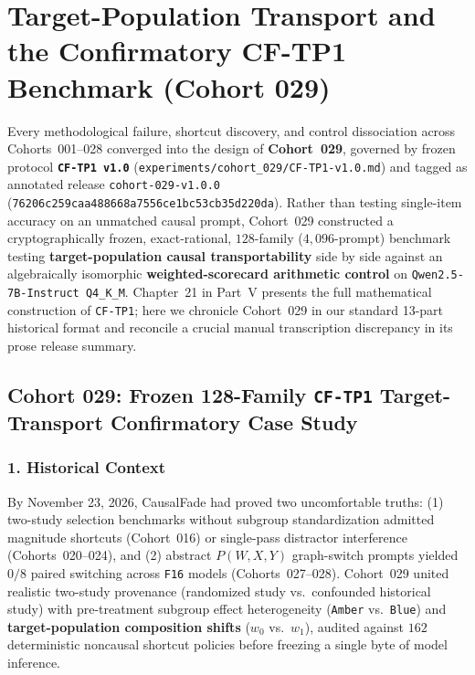 \chapter{Target-Population Transport and the Confirmatory CF-TP1 Benchmark (Cohort 029)}\label{ch:cohort_029}

Every methodological failure, shortcut discovery, and control dissociation across Cohorts~001--028 converged into the design of \textbf{Cohort~029}, governed by frozen protocol \textbf{\texttt{CF-TP1 v1.0}} (\texttt{experiments/cohort\_029/CF-TP1-v1.0.md}) and tagged as annotated release \texttt{cohort-029-v1.0.0} (\nolinkurl{76206c259caa488668a7556ce1bc53cb35d220da}). Rather than testing single-item accuracy on an unmatched causal prompt, Cohort~029 constructed a cryptographically frozen, exact-rational, $128$-family ($4{,}096$-prompt) benchmark testing \textbf{target-population causal transportability} side by side against an algebraically isomorphic \textbf{weighted-scorecard arithmetic control} on \texttt{Qwen2.5-7B-Instruct Q4\_K\_M}. Chapter~21 in Part~V presents the full mathematical construction of \texttt{CF-TP1}; here we chronicle Cohort~029 in our standard 13-part historical format and reconcile a crucial manual transcription discrepancy in its prose release summary.

\section{Cohort 029: Frozen 128-Family \texttt{CF-TP1} Target-Transport Confirmatory Case Study}

\subsection*{1. Historical Context}
By November 23, 2026, CausalFade had proved two uncomfortable truths: (1) two-study selection benchmarks without subgroup standardization admitted magnitude shortcuts (Cohort~016) or single-pass distractor interference (Cohorts~020--024), and (2) abstract $P(W,X,Y)$ graph-switch prompts yielded $0/8$ paired switching across \texttt{F16} models (Cohorts~027--028). Cohort~029 united realistic two-study provenance (randomized study vs.\ confounded historical study) with pre-treatment subgroup effect heterogeneity (\texttt{Amber} vs.\ \texttt{Blue}) and \textbf{target-population composition shifts} ($w_0$ vs.\ $w_1$), audited against $162$ deterministic noncausal shortcut policies before freezing a single byte of model inference.

